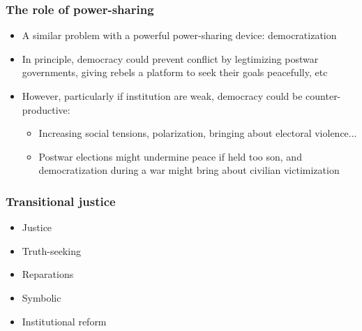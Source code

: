 \documentclass[aspectratio=43]{beamer}
\begin{document}



\begin{frame}
\frametitle{The role of power-sharing}
\centering

\begin{itemize}[<+->]
  \item A similar problem with a powerful power-sharing device: democratization
  \item In principle, democracy could prevent conflict by legtimizing postwar governments, giving rebels a platform to seek their goals peacefully, etc
  \item However, particularly if institution are weak, democracy could be counter-productive:
  \begin{itemize}
    \item Increasing social tensions, polarization, bringing about electoral violence...
    \item Postwar elections might undermine peace if held too son, and democratization during a war might bring about civilian victimization
  \end{itemize}
\end{itemize}

\end{frame}



\begin{frame}
\frametitle{Transitional justice}
\centering

\begin{itemize}[<+->]
  \item Justice
  \item Truth-seeking
  \item Reparations
  \item Symbolic
  \item Institutional reform
\end{itemize}


\end{frame}
\end{document}
